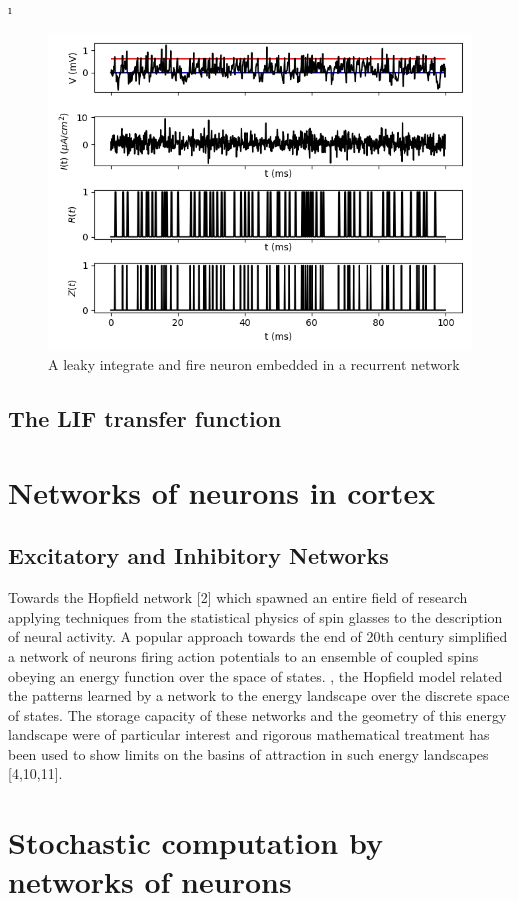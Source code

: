 \documentclass{ucetd}
\begin{document}
\i\begin{figure}
\centering
\includegraphics[width=115mm]{fig_3-A}
\caption{A leaky integrate and fire neuron embedded in a recurrent network}
\end{figure}

\subsection{The LIF transfer function}

\section{Networks of neurons in cortex}

\subsection{Excitatory and Inhibitory Networks}

Towards the Hopfield network [2] which spawned an entire field of research applying techniques from the statistical physics of spin glasses to the description of neural activity. A popular approach towards the end of 20th century simplified a network of neurons firing action potentials to an ensemble of coupled spins obeying an energy function over the space of states. , the Hopfield model related the patterns learned by a network to the energy landscape over the discrete space of states. The storage capacity of these networks and the geometry of this energy landscape were of particular interest and rigorous mathematical treatment has been used to show limits on the basins of attraction in such energy landscapes [4,10,11]. 

\section{Stochastic computation by networks of neurons}
\end{document}

